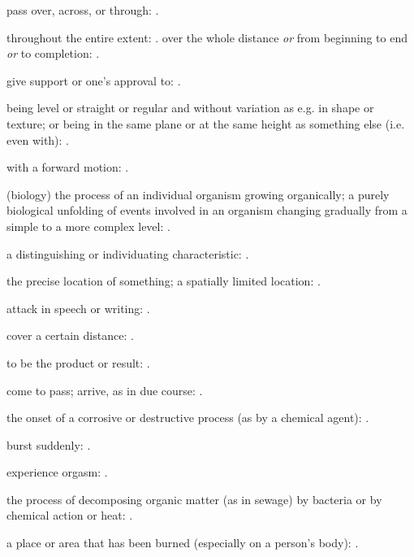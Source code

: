   pass over, across, or through:   .

  throughout the entire extent:   . over the whole distance \textit{or} from beginning to end \textit{or} to completion: .

  give support or one's approval to:   .

  being level or straight or regular and without variation as e.g. in shape or texture; or being in the same plane or at the same height as something else (i.e. even with): .

  with a forward motion:   .

  (biology) the process of an individual organism growing organically; a purely biological unfolding of events involved in an organism changing gradually from a simple to a more complex level:   .

  a distinguishing or individuating characteristic: .

  the precise location of something; a spatially limited location: .

  attack in speech or writing:   .

  cover a certain distance: .

  to be the product or result:   .

  come to pass; arrive, as in due course: .

  the onset of a corrosive or destructive process (as by a chemical agent): .

  burst suddenly: .

  experience orgasm: .

  the process of decomposing organic matter (as in sewage) by bacteria or by chemical action or heat: .

  a place or area that has been burned (especially on a person's body):   .

